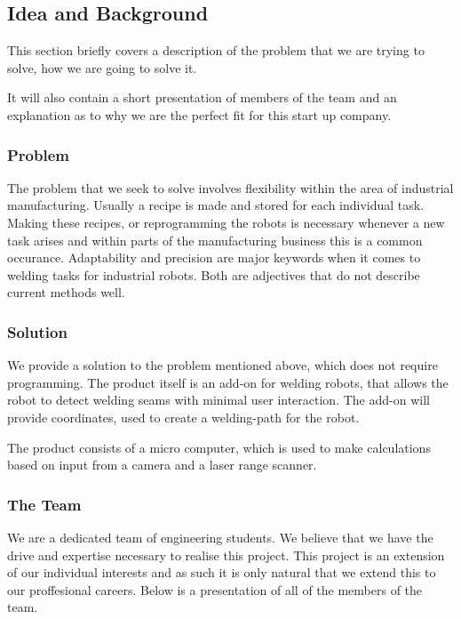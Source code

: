 \subsection{Idea and Background}
This section briefly covers a description of the problem that we are trying to solve, how we are going to solve it.

It will also contain a short presentation of members of the team and an explanation as to why we are the perfect fit for this start up company.

\subsubsection{Problem}
The problem that we seek to solve involves flexibility within the area of industrial manufacturing. Usually a recipe is made and stored for each individual task.
Making these recipes, or reprogramming the robots is necessary whenever a new task arises and within parts of the manufacturing business this is a common occurance. 
Adaptability and precision are major keywords when it comes to welding tasks for industrial robots. Both are adjectives that do not describe current methods well.

\subsubsection{Solution}
We provide a solution to the problem mentioned above, which does not require programming. The product itself is an add-on for welding robots, that allows the robot to detect welding seams with minimal user interaction. The add-on will provide coordinates, used to create a welding-path for the robot. 

The product consists of a micro computer, which is used to make calculations based on input from a camera and a laser range scanner. 
\subsubsection{The Team}
We are a dedicated team of engineering students. We believe that we have the drive and expertise necessary to realise this project. This project is an extension of our individual interests and as such it is only natural that we extend this to our proffesional careers. Below is a presentation of all of the members of the team.

